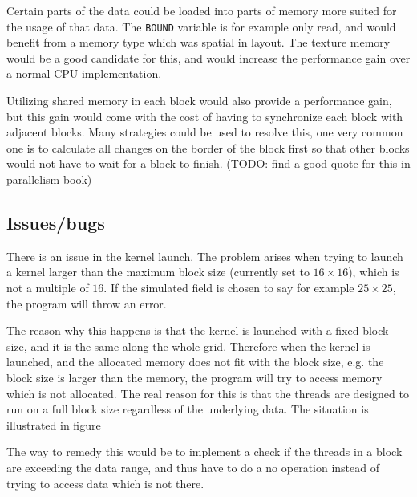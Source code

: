 Certain parts of the data could be loaded into parts of memory more suited for the usage of that data. The \texttt{BOUND} variable is for example only read, and would benefit from a memory type which was spatial in layout. The texture memory would be a good candidate for this, and would increase the performance gain over a normal CPU-implementation.

Utilizing shared memory in each block would also provide a performance gain, but this gain would come with the cost of having to synchronize each block with adjacent blocks. Many strategies could be used to resolve this, one very common one is to calculate all changes on the border of the block first so that other blocks would not have to wait for a block to finish. (TODO: find a good quote for this in parallelism book)



\subsection{Issues/bugs}
There is an issue in the kernel launch. The problem arises when trying to launch a kernel larger than the maximum block size (currently set to $16\times16$), which is not a multiple of $16$. If the simulated field is chosen to say for example $25\times25$, the program will throw an error.

The reason why this happens is that the kernel is launched with a fixed block size, and it is the same along the whole grid. Therefore when the kernel is launched, and the allocated memory does not fit with the block size, e.g. the block size is larger than the memory, the program will try to access memory which is not allocated. The real reason for this is that the threads are designed to run on a full block size regardless of the underlying data. The situation is illustrated in figure 


The way to remedy this would be to implement a check if the threads in a block are exceeding the data range, and thus have to do a no operation instead of trying to access data which is not there.